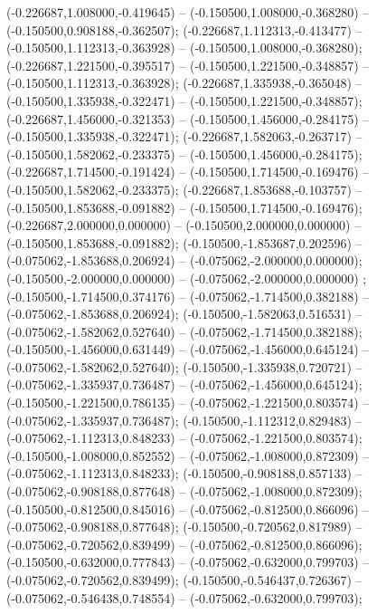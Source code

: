  (-0.226687,1.008000,-0.419645) -- (-0.150500,1.008000,-0.368280) -- (-0.150500,0.908188,-0.362507);
 (-0.226687,1.112313,-0.413477) -- (-0.150500,1.112313,-0.363928) -- (-0.150500,1.008000,-0.368280);
 (-0.226687,1.221500,-0.395517) -- (-0.150500,1.221500,-0.348857) -- (-0.150500,1.112313,-0.363928);
 (-0.226687,1.335938,-0.365048) -- (-0.150500,1.335938,-0.322471) -- (-0.150500,1.221500,-0.348857);
 (-0.226687,1.456000,-0.321353) -- (-0.150500,1.456000,-0.284175) -- (-0.150500,1.335938,-0.322471);
 (-0.226687,1.582063,-0.263717) -- (-0.150500,1.582062,-0.233375) -- (-0.150500,1.456000,-0.284175);
 (-0.226687,1.714500,-0.191424) -- (-0.150500,1.714500,-0.169476) -- (-0.150500,1.582062,-0.233375);
 (-0.226687,1.853688,-0.103757) -- (-0.150500,1.853688,-0.091882) -- (-0.150500,1.714500,-0.169476);
 (-0.226687,2.000000,0.000000) -- (-0.150500,2.000000,0.000000) -- (-0.150500,1.853688,-0.091882);
 (-0.150500,-1.853687,0.202596) -- (-0.075062,-1.853688,0.206924) -- (-0.075062,-2.000000,0.000000);
 (-0.150500,-2.000000,0.000000) -- (-0.075062,-2.000000,0.000000) ;
 (-0.150500,-1.714500,0.374176) -- (-0.075062,-1.714500,0.382188) -- (-0.075062,-1.853688,0.206924);
 (-0.150500,-1.582063,0.516531) -- (-0.075062,-1.582062,0.527640) -- (-0.075062,-1.714500,0.382188);
 (-0.150500,-1.456000,0.631449) -- (-0.075062,-1.456000,0.645124) -- (-0.075062,-1.582062,0.527640);
 (-0.150500,-1.335938,0.720721) -- (-0.075062,-1.335937,0.736487) -- (-0.075062,-1.456000,0.645124);
 (-0.150500,-1.221500,0.786135) -- (-0.075062,-1.221500,0.803574) -- (-0.075062,-1.335937,0.736487);
 (-0.150500,-1.112312,0.829483) -- (-0.075062,-1.112313,0.848233) -- (-0.075062,-1.221500,0.803574);
 (-0.150500,-1.008000,0.852552) -- (-0.075062,-1.008000,0.872309) -- (-0.075062,-1.112313,0.848233);
 (-0.150500,-0.908188,0.857133) -- (-0.075062,-0.908188,0.877648) -- (-0.075062,-1.008000,0.872309);
 (-0.150500,-0.812500,0.845016) -- (-0.075062,-0.812500,0.866096) -- (-0.075062,-0.908188,0.877648);
 (-0.150500,-0.720562,0.817989) -- (-0.075062,-0.720562,0.839499) -- (-0.075062,-0.812500,0.866096);
 (-0.150500,-0.632000,0.777843) -- (-0.075062,-0.632000,0.799703) -- (-0.075062,-0.720562,0.839499);
 (-0.150500,-0.546437,0.726367) -- (-0.075062,-0.546438,0.748554) -- (-0.075062,-0.632000,0.799703);
